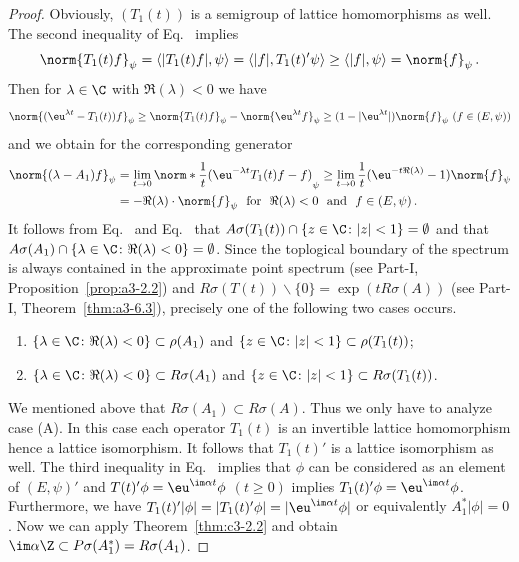 \begin{proof}
	Obviously, $(T_{1}(t))$ is a semigroup of lattice homomorphisms as well. 
	The second inequality of Eq.~ implies
	\begin{equation}\label{eq:c3-4.3}
	\norm{T_{1}(t)f}_{\psi} = \langle|T_{1}(t)f|,\psi\rangle = \langle|f|,T_{1}(t)'\psi\rangle \geq \langle|f|,\psi\rangle = \norm{f}_{\psi}\,.
	\end{equation}
	Then for $\lambda \in \C $ with $\Re(\lambda) < 0$ we have 
	\[ 
	\norm{(\eu^{\lambda t}-T_{1}(t))f}_{\psi} \geq \norm{T_{1}(t)f}_{\psi}-\norm{\eu^{\lambda t}f}_{\psi} \geq (1-|\eu^{\lambda t}|)\norm{f}_{\psi} \ (f \in (E,\psi))
	\]
	and we obtain for the corresponding generator
	\begin{equation}\label{eq:c3-4.4}
		\begin{split}
		\norm{(\lambda-A_{1})f}_{\psi} &= \lim_{t \to 0}\norm*{\frac{1}{t}(\eu^{-\lambda t}T_{1}(t)f-f)}_{\psi} \geq \lim_{t \to 0}\frac{1}{t}(\eu^{-t\Re(\lambda)}-1)\norm{f}_{\psi}\\
		&= -\Re(\lambda)\cdot\norm{f}_{\psi} \ \text{ for } \ \Re(\lambda) < 0 \ \text{ and } \ f \in (E,\psi)\,.
		\end{split}
	\end{equation}
	It follows from Eq.~ and Eq.~ that $A\sigma(T_{1}(t))\cap\{z \in \C  \colon |z| < 1\} = \emptyset$ and that $A\sigma(A_{1})\cap\{\lambda \in \C  \colon \Re(\lambda) < 0\} = \emptyset$. 
	Since the toplogical boundary of the spectrum is always contained in the approximate point spectrum (see Part-I, Proposition~\ref{prop:a3-2.2}) and 
    $R\sigma(T(t))\backslash\{0\} = \exp(tR\sigma(A))$ (see Part-I, Theorem~\ref{thm:a3-6.3}), precisely one of the following two cases occurs.
	\begin{enumerate}[\upshape (A)]
		\item
		$\{\lambda \in \C  \colon \Re(\lambda) < 0\} \subset \rho(A_{1})$ and $\{z \in \C  \colon |z| < 1\} \subset \rho(T_{1}(t))$;
		
		\item
		$\{\lambda \in \C  \colon \Re(\lambda) < 0\} \subset R\sigma(A_{1})$ and $\{z \in \C  \colon |z| < 1\} \subset R\sigma(T_{1}(t))$.
	\end{enumerate}
	
	We mentioned above that $R\sigma(A_{1}) \subset R\sigma(A)$. 
	Thus we only have to analyze case (A). 
	In this case each operator $T_{1}(t)$ is an invertible lattice homomorphism hence a lattice isomorphism. 
	It follows that $T_{1}(t)'$ is a lattice isomorphism as well. 
	The third inequality in Eq.~ implies that $\phi$ can be considered as an element of\/ $(E,\psi)'$ and $T(t)'\phi = \eu^{\im\alpha t}\phi$ $(t \geq 0)$ implies $T_{1}(t)'\phi = \eu^{\im\alpha t}\phi$. 
	Furthermore, we have
	$T_{1}(t)'|\phi| = |T_{1}(t)'\phi| = |\eu^{\im\alpha t}\phi|$ or equivalently $A_{1}^*|\phi| = 0$.
	Now we can apply 
	Theorem~\ref{thm:c3-2.2} 
	and obtain $\im\alpha\Z \subset P\sigma(A_{1}^*) = R\sigma(A_{1})$.
	\end{proof}

